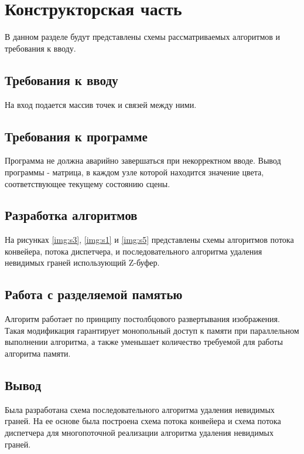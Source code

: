 \chapter{Конструкторская часть}
 В данном разделе будут представлены схемы рассматриваемых алгоритмов и требования к вводу.

\section{Требования к вводу}
На вход подается массив точек и связей между ними. 

\section{Требования к программе}

Программа не должна аварийно завершаться при некорректном вводе. Вывод программы - матрица, в каждом узле которой находится значение цвета, соответствующее текущему состоянию сцены.

\section{Разработка алгоритмов}

На рисунках \ref{img:s3}, \ref{img:s1} и \ref{img:s5} представлены схемы алгоритмов потока конвейера, потока диспетчера, и последовательного алгоритма удаления невидимых граней использующий Z-буфер.

\section{Работа с разделяемой памятью}

Алгоритм работает по принципу постолбцового развертывания изображения. Такая модификация гарантирует монопольный доступ к памяти при параллельном выполнении алгоритма, а также уменьшает количество требуемой для работы алгоритма памяти.

\newpage
{}

\newpage
{}

\newpage
{}

\newpage
\section*{Вывод}
Была разработана схема последовательного алгоритма удаления невидимых граней. На ее основе была построена схема потока конвейера и схема потока диспетчера для многопоточной реализации алгоритма удаления невидимых граней.